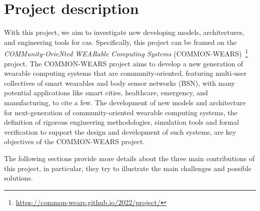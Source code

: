 \documentclass[12pt,a4paper]{article}
\begin{document}

\section{Project description}\label{sec:project-description}
With this project,
we aim to investigate new developing models,
architectures,
and engineering tools for \ac{cas}.
%
Specifically,
this project can be framed on the \emph{COMMunity-OrieNted WEARable Computing Systems} (COMMON-WEARS)~\footnote{\url{https://common-wears.github.io/2022/project/}} project.
%
The COMMON-WEARS project aims to develop a new generation of wearable computing systems that are community-oriented,
featuring multi-user collectives of smart wearables and body sensor networks (BSN),
with many potential applications like smart cities,
healthcare,
emergency,
and manufacturing, to cite a few.
%
The development of new models and architecture for next-generation of community-oriented wearable computing systems,
the definition of rigorous engineering methodologies,
simulation tools and formal verification to support the design and development of such systems,
are key objectives of the COMMON-WEARS project.

The following sections provide more details about the three main contributions of this project,
in particular,
they try to illustrate the main challenges and possible solutions.
\end{document}
